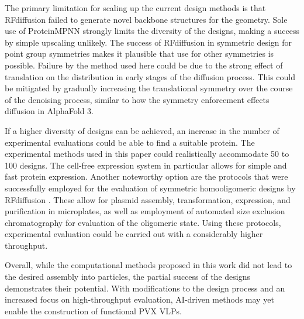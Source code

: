 The primary limitation for scaling up the current design methods is that RFdiffusion failed to generate novel backbone structures for the geometry. Sole use of ProteinMPNN strongly limits the diversity of the designs, making a success by simple upscaling unlikely. The success of RFdiffusion in symmetric design for point group symmetries makes it plausible that use for other symmetries is possible. Failure by the method used here could be due to the strong effect of translation on the distribution in early stages of the diffusion process. This could be mitigated by gradually increasing the translational symmetry over the course of the denoising process, similar to how the symmetry enforcement effects diffusion in AlphaFold 3.

If a higher diversity of designs can be achieved, an increase in the number of experimental evaluations could be able to find a suitable protein. The experimental methods used in this paper could realistically accommodate 50 to 100 designs. The cell-free expression system in particular allows for simple and fast protein expression. Another noteworthy option are the protocols that were successfully employed for the evaluation of symmetric homooligomeric designs by RFdiffusion \cite{RFdiffusion}. These allow for plasmid assembly, transformation, expression, and purification in microplates, as well as employment of automated size exclusion chromatography for evaluation of the oligomeric state. Using these protocols, experimental evaluation could be carried out with a considerably higher throughput. 

Overall, while the computational methods proposed in this work did not lead to the desired assembly into particles, the partial success of the designs demonstrates their potential. With modifications to the design process and an increased focus on high-throughput evaluation, AI-driven methods may yet enable the construction of functional PVX VLPs.